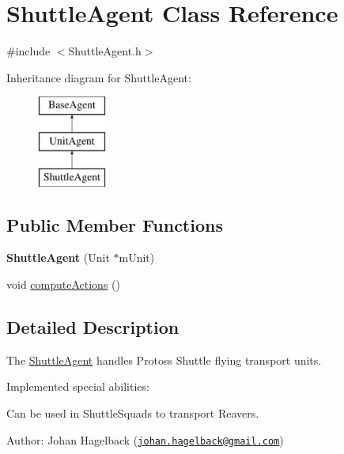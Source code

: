 \hypertarget{class_shuttle_agent}{
\section{ShuttleAgent Class Reference}
\label{class_shuttle_agent}
}


{\ttfamily \#include $<$ShuttleAgent.h$>$}

Inheritance diagram for ShuttleAgent:\begin{figure}[H]
\begin{center}
\leavevmode
\includegraphics[height=3.000000cm]{class_shuttle_agent}
\end{center}
\end{figure}
\subsection*{Public Member Functions}
\begin{DoxyCompactItemize}
\item 
\hypertarget{class_shuttle_agent_af36b5325b6ed7de7ab6c828903f3831d}{
{\bfseries ShuttleAgent} (Unit $\ast$mUnit)}
\label{class_shuttle_agent_af36b5325b6ed7de7ab6c828903f3831d}

\item 
void \hyperlink{class_shuttle_agent_a9ff1d2e2a0874e2205d7339e216df8eb}{computeActions} ()
\end{DoxyCompactItemize}


\subsection{Detailed Description}
The \hyperlink{class_shuttle_agent}{ShuttleAgent} handles Protoss Shuttle flying transport units.

Implemented special abilities:
\begin{DoxyItemize}
\item Can be used in ShuttleSquads to transport Reavers.
\end{DoxyItemize}

Author: Johan Hagelback (\href{mailto:johan.hagelback@gmail.com}{\tt johan.hagelback@gmail.com}) 


